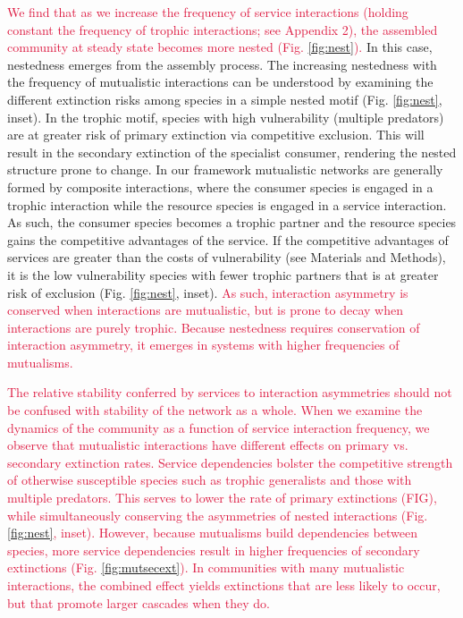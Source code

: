 \documentclass[twocolumn,preprintnumbers,amsmath,amssymb,superscriptaddress,linenumbers]{revtex4-1}
\newcommand{\rev}[1]{\textcolor{crimson}{#1}}
\begin{document}
\rev{We find that as we increase the frequency of service interactions (holding constant the frequency of trophic interactions; see Appendix 2), the assembled community at steady state becomes more nested (Fig. \ref{fig:nest}).}
In this case, nestedness emerges from the assembly process.
The increasing nestedness with the frequency of mutualistic interactions can be understood by examining the different extinction risks among species in a simple nested motif (Fig. \ref{fig:nest}, inset).
In the trophic motif, species with high vulnerability (multiple predators) are at greater risk of primary extinction via competitive exclusion.
This will result in the secondary extinction of the specialist consumer, rendering the nested structure prone to change.
In our framework mutualistic networks are generally formed by composite interactions, where the consumer species is engaged in a trophic interaction while the resource species is engaged in a service interaction.
As such, the consumer species becomes a trophic partner and the resource species gains the competitive advantages of the service.
If the competitive advantages of services are greater than the costs of vulnerability (see Materials and Methods), it is the low vulnerability species with fewer trophic partners that is at greater risk of exclusion (Fig. \ref{fig:nest}, inset).
\rev{As such, interaction asymmetry is conserved when interactions are mutualistic, but is prone to decay when interactions are purely trophic.
Because nestedness requires conservation of interaction asymmetry, it emerges in systems with higher frequencies of mutualisms.}

\rev{The relative stability conferred by services to interaction asymmetries should not be confused with stability of the network as a whole.
When we examine the dynamics of the community as a function of service interaction frequency, we observe that mutualistic interactions have different effects on primary vs. secondary extinction rates.
Service dependencies bolster the competitive strength of otherwise susceptible species such as trophic generalists and those with multiple predators.
This serves to lower the rate of primary extinctions (FIG), while simultaneously conserving the asymmetries of nested interactions (Fig. \ref{fig:nest}, inset).
However, because mutualisms build dependencies between species, more service dependencies result in higher frequencies of secondary extinctions (Fig. \ref{fig:mutsecext}).
In communities with many mutualistic interactions, the combined effect yields extinctions that are less likely to occur, but that promote larger cascades when they do.}
\end{document}
